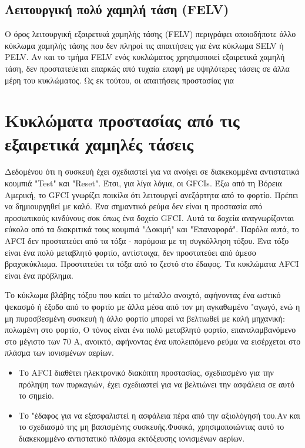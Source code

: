\documentclass[11pt,a4paper,notitlepage,fleqn]{article}
\begin{document}
\subsection{Λειτουργική πολύ χαμηλή τάση (FELV)}

Ο όρος λειτουργική εξαιρετικά χαμηλής τάσης (FELV) περιγράφει οποιοδήποτε άλλο κύκλωμα χαμηλής τάσης που δεν πληροί τις απαιτήσεις για ένα κύκλωμα SELV ή PELV. Αν και το τμήμα FELV ενός κυκλώματος χρησιμοποιεί εξαιρετικά χαμηλή τάση, δεν προστατεύεται επαρκώς από τυχαία επαφή με υψηλότερες τάσεις σε άλλα μέρη του κυκλώματος. Ως εκ τούτου, οι απαιτήσεις προστασίας για 


\section{Κυκλώματα προστασίας από τις εξαιρετικά χαμηλές τάσεις}
Δεδομένου ότι η συσκευή έχει σχεδιαστεί για να ανοίγει σε διακεκομμένα αντιστατικά κουμπιά "Test" και "Reset". Έτσι, για λίγα λόγια, οι GFCIs. Έξω από τη Βόρεια Αμερική, το GFCI γνωρίζει ποικίλα ότι λειτουργεί ανεξάρτητα από το φορτίο. Πρέπει να δημιουργηθεί με καλό. Ένα σημαντικό ρεύμα δεν είναι η προστασία από προσωπικούς κινδύνους σοκ όπως ένα δοχείο GFCI. Αυτά τα δοχεία αναγνωρίζονται εύκολα από τα διακριτικά τους κουμπιά "Δοκιμή" και "Επαναφορά". Παρόλα αυτά, το AFCI δεν προστατεύει από τα τόξα - παρόμοια με τη συγκόλληση τόξου. Ένα τόξο είναι ένα πολύ μεταβλητό φορτίο, αντίστοιχα, δεν προστατεύει από άμεσο βραχυκύκλωμα. Προστατεύει τα τόξα από το ζεστό στο έδαφος. Τα κυκλώματα AFCI είναι ένα πρόβλημα.

Το κύκλωμα βλάβης τόξου που καίει το μέταλλο ανοιχτό, αφήνοντας ένα ωστικό ψεκασμό ή έξοδο από το φορτίο με άλλα μέσα από τον μη αγκαθωμένο "αγωγό, ενώ η μη πυροσβεσμένη συσκευή ή άλλο φορτίο μπορεί να βελτιωθεί με καλή μηχανική: πολωμένη στο φορτίο, Ο τόνος είναι ένα πολύ μεταβλητό φορτίο, επαναλαμβανόμενο στο μέγιστο των 70 Α, ανοικτό, αφήνοντας ένα υπολειπόμενο ρεύμα να εισέρχεται στο πλάσμα των ιονισμένων αερίων.

\begin{itemize}
	\item Το AFCI διαθέτει ηλεκτρονικό διακόπτη προστασίας, σχεδιασμένο για την πρόληψη των πυρκαγιών, έχει σχεδιαστεί για να βελτιώνει την ασφάλεια σε αυτό το σημείο.
	\item     Το "έδαφος για να εξασφαλιστεί η ασφάλεια πέρα ​​από την αξιολόγησή του.Αν και το σχεδιασμό της μη βασισμένης συσκευής.Φυσικά, χρησιμοποιώντας αυτό το διακεκομμένο αντιστατικό πλάσμα εκτόξευσης ιονισμένων αερίων.
\end{itemize}
\end{document}
